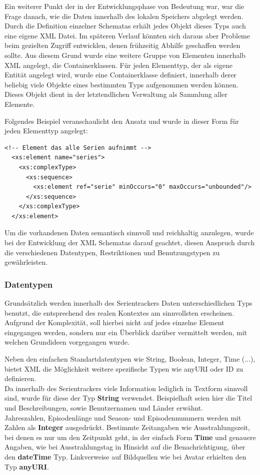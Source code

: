 \documentclass[a4paper]{article}
\begin{document}
Ein weiterer Punkt der in der Entwicklungsphase von Bedeutung war, war die Frage danach, wie die Daten innerhalb des lokalen Speichers abgelegt werden.
Durch die Definition einzelner Schematas erhält jedes Objekt dieses Typs auch eine eigene XML Datei. Im späteren Verlauf könnten sich daraus aber Probleme beim gezielten Zugriff entwicklen, denen frühzeitig Abhilfe geschaffen werden sollte.
Aus diesem Grund wurde eine weitere Gruppe von Elementen innerhalb XML angelegt, die Containerklassen. 
Für jeden Elementtyp, der als eigene Entität angelegt wird, wurde eine Containerklasse definiert, innerhalb derer beliebig viele Objekte eines bestimmten Typs aufgenommen werden können. Dieses Objekt dient in der letztendlichen Verwaltung als Sammlung aller Elemente.

Folgendes Beispiel veranschaulicht den Ansatz und wurde in dieser Form für jeden Elementtyp angelegt:


\begin{lstlisting}[label=xsd-definition,caption= Auszug aus der Series.xsd Definition]
<!-- Element das alle Serien aufnimmt -->
  <xs:element name="series">
    <xs:complexType>
      <xs:sequence>
        <xs:element ref="serie" minOccurs="0" maxOccurs="unbounded"/>
      </xs:sequence>
    </xs:complexType>
  </xs:element>
\end{lstlisting}


Um die vorhandenen Daten semantisch sinnvoll und reichhaltig anzulegen, wurde bei der Entwicklung der XML Schematas darauf geachtet, diesen Anspruch 
durch die verschiedenen Datentypen, Restriktionen und Benutzungstypen zu gewährleisten.  

\newpage

\subsubsection{Datentypen}
Grundsätzlich werden innerhalb des Serientrackers Daten unterschiedlichen Typs benutzt, die entsprechend des realen Kontextes am sinnvollsten erscheinen.
Aufgrund der Komplexität, soll hierbei nicht auf jedes einzelne Element eingegangen werden, sondern nur ein Überblick darüber vermittelt werden, mit welchen Grundideen vorgegangen wurde.

Neben den einfachen Standartdatentypen wie String, Boolean, Integer, Time (...), bietet XML die Möglichkeit weitere spezifische Typen wie anyURI oder ID zu definieren.\\ 
Da innerhalb des Serientrackers viele Information lediglich in Textform sinnvoll sind, wurde für diese der Typ \textbf{String} verwendet. Beispielhaft seien hier die Titel und Beschreibungen, sowie Benutzernamen und Länder erwähnt.\\ 
Jahreszahlen, Episodenlänge und Season- und Episodennummern werden mit Zahlen als \textbf{Integer} ausgedrückt. Bestimmte Zeitangaben wie Ausstrahlungszeit, bei denen es nur um den Zeitpunkt geht, in der einfach Form \textbf{Time} und genauere Angaben, wie bei Ausstrahlungstag in Hinsicht auf die Benachrichtigung, über den \textbf{dateTime} Typ. 
Linkverweise auf Bildquellen wie bei Avatar erhielten den Typ \textbf{anyURI}.\\
\end{document}
